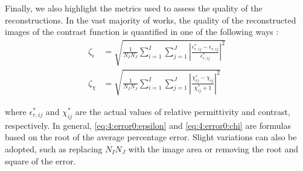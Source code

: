 		Finally, we also highlight the metrics used to assess the quality of the reconstructions. In the vast majority of works, the quality of the reconstructed images of the contrast function is quantified in one of the following ways \citep{wang1989iterative,chew1990reconstruction,shah20193d,oliveri2019compressive,oliveri2011multiresolution,salucci2017multifrequency,zhang2020learning}:
		\begin{align}
			\zeta_{\epsilon} &= \sqrt{\frac{1}{N_IN_J}\sum\limits_{i=1}^{I}\sum\limits_{j=1}^J\left|\frac{\epsilon^*_{r,ij}-\epsilon_{r,ij}}{\epsilon^*_{r,ij}}\right|^2} \label{eq:4:error0:epsilon} \\
			\zeta_{\chi} &= \sqrt{\frac{1}{N_IN_J}\sum\limits_{i=1}^{I}\sum\limits_{j=1}^J\left|\frac{\chi^*_{ij}-\chi_{ij}}{\chi^*_{ij}+1}\right|^2} \label{eq:4:error0:chi}
		\end{align}
		
		\noindent where $\epsilon^*_{r,ij}$ and $\chi^*_{ij}$ are the actual values of relative permittivity and contrast, respectively. In general, \eqref{eq:4:error0:epsilon} and \eqref{eq:4:error0:chi} are formulas based on the root of the average percentage error. Slight variations can also be adopted, such as replacing $N_IN_J$ with the image area or removing the root and square of the error.
		
